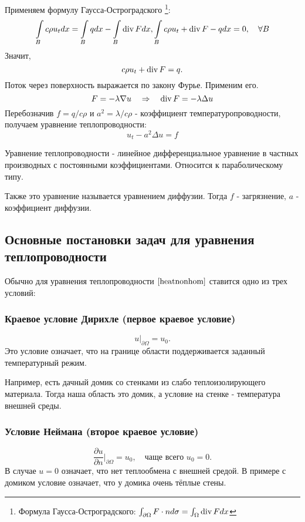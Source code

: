 Применяем формулу Гаусса-Остроградского \footnote{Формула Гаусса-Остроградского: $\int_{\partial \Omega} F \cdot n d\sigma = \int_{\Omega} \operatorname{div} F dx$}:
\begin{gather*}
	\int \limits_B c \rho u_t dx = \int \limits_B q dx - \int \limits_B \operatorname{div} F dx,
	\int \limits_B c \rho u_t + \operatorname{div} F - q dx = 0,\quad \forall B
\end{gather*}
Значит,
$$ c \rho u_t + \operatorname{div} F = q.$$
Поток через поверхность выражается по закону Фурье. Применим его.
$$ F = - \lambda \nabla u \quad \Rightarrow \quad \operatorname{div} F = - \lambda \Delta u$$
Перебозначив $f = q/c\rho$ и $ a^2 = \lambda / c \rho $ - коэффициент температуропроводности, получаем уравнение теплопроводности:
\begin{equation}
	u_t - a^2 \Delta u = f
\label{heatnonhom}
\end{equation}

Уравнение теплопроводности - линейное дифференциальное уравнение в частных производных с постоянными коэффициентами. Относится к параболическому типу.

Также это уравнение называется уравнением диффузии. Тогда $f$ - загрязнение, $a$ - коэффициент диффузии.

\subsection{Основные постановки задач для уравнения теплопроводности}
Обычно для уравнения теплопроводности $\eqref{heatnonhom}$ ставится одно из трех условий:

\subsubsection{Краевое условие Дирихле (первое краевое условие)}
$$u \Bigg \rvert_{\partial\Omega} = u_0.$$
Это условие означает, что на границе области поддерживается заданный температурный режим.

Например, есть дачный домик со стенками из слабо теплоизолирующего материала. Тогда наша область это домик, а условие на стенке - температура внешней среды.

\subsubsection{Условие Неймана (второе краевое условие)}
$$\dfrac{\partial u}{\partial n}\Bigg\rvert_{\partial\Omega} = u_0, \quad \text{чаще всего }u_0 = 0.$$
В случае $u = 0$ означает, что нет теплообмена с внешней средой. В примере с домиком условие означает, что у домика очень тёплые стены.

